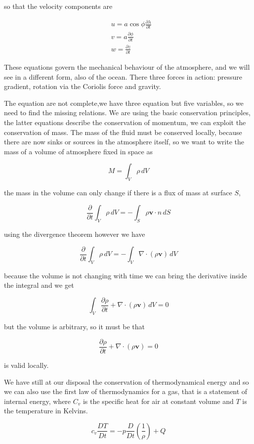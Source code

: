 so that the velocity components are

\[\begin{aligned}
      &u = a\cos{\phi\frac{\partial \lambda}{\partial t}}\\
      &v = a \frac{\partial \phi}{\partial t}\\
      &w = \frac{\partial z}{\partial t}
\end{aligned}\]

These equations govern the mechanical behaviour of the atmosphere, and we will see in a different form, also of the ocean. There three forces in action: pressure gradient, rotation via the Coriolis force and gravity.

The equation are not complete,we have three equation but five variables, so we need to find the missing relations. We are using the basic conservation principles, the latter equations describe the conservation
of momentum, we can exploit the conservation of mass. The mass of the fluid must be conserved locally, because there are now sinks or sources in the atmosphere itself, so we want to write the mass of a volume of
atmosphere fixed in space as

\[M = \int_V  \rho \,dV\]

the mass in the volume can only change if there is a flux of mass at surface \(S\),

\[\frac{\partial }{\partial t} \int_V  \rho \,dV = -\int_S \rho\mathbf{v}\cdot n \, dS\]

using the divergence theorem however we have

\[\frac{\partial }{\partial t} \int_V  \rho \,dV = -\int_V \nabla\cdot(\rho\mathbf{v}) \,dV\]

because the volume is not changing with time we can bring the derivative inside the integral and we get

\[\int_V  \frac{\partial \rho}{\partial t}+\nabla\cdot(\rho\mathbf{v}) \,dV = 0\]

but the volume is arbitrary, so it must be that

\[\frac{\partial \rho}{\partial t}+\nabla\cdot(\rho\mathbf{v}) = 0\]

is valid locally.

We have still at our disposal the conservation of thermodynamical energy and so we can also use the first law of thermodynamics for a gas, that is a statement of internal energy, where $C_v$ is the specific heat for air at constant volume and $T$ is the temperature in Kelvins.

\[c_v\frac{D T}{Dt} = -p\frac{D }{Dt}\left(\frac{1}{\rho}\right)+ Q\]

